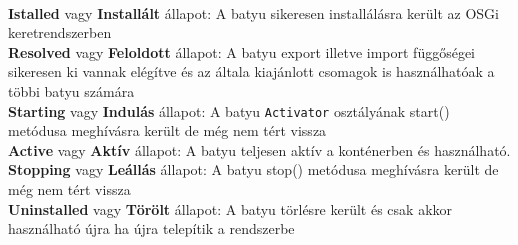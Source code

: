 \\\textbf{Istalled} vagy \textbf{Installált} állapot: A batyu sikeresen installálásra került az OSGi keretrendszerben
\\\textbf{Resolved} vagy \textbf{Feloldott} állapot: A batyu export illetve import függőségei sikeresen ki vannak elégítve és az általa kiajánlott csomagok is használhatóak a többi batyu számára
\\\textbf{Starting} vagy \textbf{Indulás} állapot: A batyu \texttt{Activator} osztályának start() metódusa meghívásra került de még nem tért vissza
\\\textbf{Active} vagy \textbf{Aktív} állapot: A batyu teljesen aktív a konténerben és használható.
\\\textbf{Stopping} vagy \textbf{Leállás} állapot: A batyu stop() metódusa meghívásra került de még nem tért vissza
\\\textbf{Uninstalled} vagy \textbf{Törölt} állapot: A batyu törlésre került és csak akkor használható újra ha újra telepítik a rendszerbe
